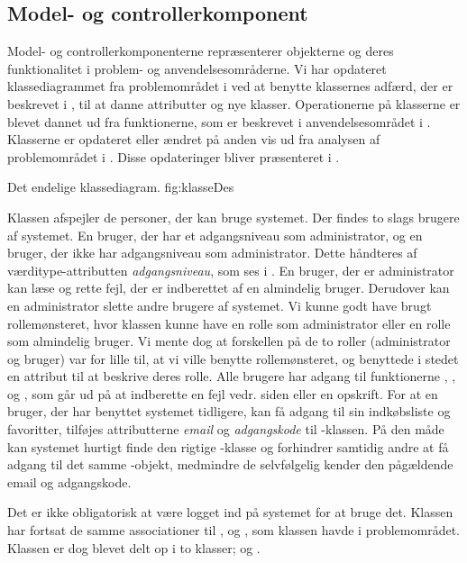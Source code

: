 \subsection{Model- og controllerkomponent}
\label{sec:modelfunktion}

Model- og controllerkomponenterne repræsenterer objekterne og deres funktionalitet i problem- og anvendelsesområderne. Vi har opdateret klassediagrammet fra problemområdet i  ved at benytte klassernes adfærd, der er beskrevet i , til at danne attributter og nye klasser. Operationerne på klasserne er blevet dannet ud fra funktionerne, som er beskrevet i anvendelsesområdet i . Klasserne er opdateret eller ændret på anden vis ud fra analysen af problemområdet i . Disse opdateringer bliver præsenteret i .


	{Det endelige klassediagram.}
	{fig:klasseDes}

Klassen  afspejler de personer, der kan bruge systemet. Der findes to slags brugere af systemet. En bruger, der har et adgangsniveau som administrator, og en bruger, der ikke har adgangsniveau som administrator. Dette håndteres af værditype-attributten \textit{adgangsniveau}, som ses i . En bruger, der er administrator kan læse og rette fejl, der er indberettet af en almindelig bruger. Derudover kan en administrator slette andre brugere af systemet. Vi kunne godt have brugt rollemønsteret, hvor klassen  kunne have en rolle som administrator eller en rolle som almindelig bruger. Vi mente dog at forskellen på de to roller (administrator og bruger) var for lille til, at vi ville benytte rollemønsteret, og benyttede i stedet en attribut til at beskrive deres rolle. Alle brugere har adgang til funktionerne , ,  og , som går ud på at indberette en fejl vedr. siden eller en opskrift.
For at en bruger, der har benyttet systemet tidligere, kan få adgang til sin indkøbsliste og favoritter, tilføjes attributterne \textit{email} og \textit{adgangskode} til -klassen. På den måde kan systemet hurtigt finde den rigtige -klasse og forhindrer samtidig andre at få adgang til det samme -objekt, medmindre de selvfølgelig kender den pågældende email og adgangskode.

Det er ikke obligatorisk at være logget ind på systemet for at bruge det. Klassen  har fortsat de samme associationer til ,  og , som klassen havde i problemområdet. Klassen  er dog blevet delt op i to klasser;  og .

